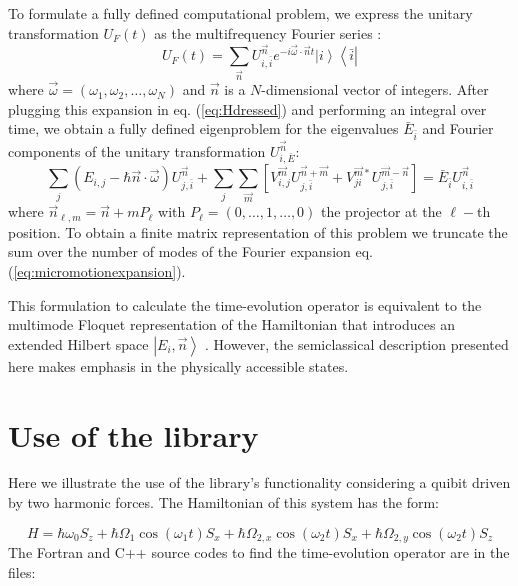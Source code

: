 \documentclass[10pt,a4paper]{article}
\begin{document}
To formulate a fully defined computational problem, we express the unitary transformation $U_F(t)$ as the multifrequency Fourier series \cite{ho1983semiclassical}:
\begin{equation}
U_F(t) = \sum_{\vec{n}} U_{i,\bar{i}}^{\vec{n}} e^{-i\vec{\omega} \cdot \vec{n}t} \left| i \right\rangle \left\langle \bar{i} \right|
\label{eq:micromotionexpansion}
\end{equation}
where $\vec{\omega} = (\omega_1,\omega_2,\ldots,\omega_N)$ and $\vec{n}$ is a $N$-dimensional vector of integers. After plugging this expansion in eq. (\ref{eq:Hdressed}) and performing an integral over time, we obtain a fully defined eigenproblem for the eigenvalues $\bar{E}_{\bar{i}}$ and Fourier components of the unitary transformation $U_{i,\bar{E}}^{\vec{n}}$:
\begin{equation}
\sum_j(E_{i,j} - \hbar \vec{n} \cdot \vec{\omega})U^{\vec{n}}_{j,\bar{i}} + \sum_{j} \sum_{\vec{m}} \left[ V^{\vec{m}}_{i,j} U^{\vec{n}+\vec{m}}_{j,\bar{i}} + V^{\vec{m}*}_{ji} U^{\vec{m}-\vec{n}}_{j,\bar{i}}\right] = \bar{E}_{\bar{i}}U^{\vec{n}}_{i,\bar{i}}
\label{eq:multimodeeigenproblem}
\end{equation}
where $\vec{n}_{\ell,m} = \vec{n} + m P_{\ell}$ with $P_{\ell} = (0,\ldots, 1, \ldots,0)$ the projector at the $\ell-$th position. To obtain a finite matrix representation of this problem we truncate the sum over the number of modes of the Fourier expansion eq. (\ref{eq:micromotionexpansion}). 

This formulation to calculate the time-evolution operator is equivalent to the multimode Floquet representation of the Hamiltonian that introduces an extended Hilbert space $\left| E_i,\vec{n} \right\rangle$  \cite{ho1983semiclassical,verdeny2016quasi}. However, the semiclassical description presented here makes emphasis in the physically accessible states. 


\section{Use of the library}

Here we illustrate the use of the library's functionality considering a quibit driven by two harmonic forces.  The Hamiltonian of this system has the form:

\begin{equation}
H = \hbar \omega_0 S_z + \hbar \Omega_1 \cos(\omega_1 t) S_x + \hbar \Omega_{2,x} \cos(\omega_2 t) S_x + \hbar \Omega_{2,y} \cos(\omega_2 t)  S_z
\label{eq:dressedqubitmodel}
\end{equation}
The Fortran and C++ source codes to find the time-evolution operator are in the files:
\end{document}
